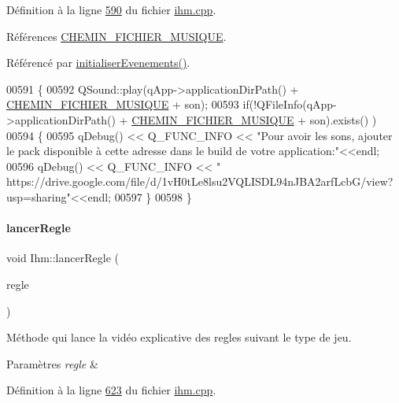 Définition à la ligne \hyperlink{ihm_8cpp_source_l00590}{590} du fichier \hyperlink{ihm_8cpp_source}{ihm.\+cpp}.



Références \hyperlink{ihm_8h_source_l00032}{C\+H\+E\+M\+I\+N\+\_\+\+F\+I\+C\+H\+I\+E\+R\+\_\+\+M\+U\+S\+I\+Q\+UE}.



Référencé par \hyperlink{ihm_8cpp_source_l00075}{initialiser\+Evenements()}.


\begin{DoxyCode}
00591 \{
00592     QSound::play(qApp->applicationDirPath() + \hyperlink{ihm_8h_aaf7f17312e64cf24f4c93fc657e5594f}{CHEMIN\_FICHIER\_MUSIQUE} + son);
00593     \textcolor{keywordflow}{if}(!QFileInfo(qApp->applicationDirPath() + \hyperlink{ihm_8h_aaf7f17312e64cf24f4c93fc657e5594f}{CHEMIN\_FICHIER\_MUSIQUE} + son).exists()
      )
00594     \{
00595         qDebug() << Q\_FUNC\_INFO << \textcolor{stringliteral}{"Pour avoir les sons, ajouter le pack disponible à cette adresse dans le
       build de votre application:"}<<endl;
00596         qDebug() << Q\_FUNC\_INFO << \textcolor{stringliteral}{"
      https://drive.google.com/file/d/1vH0tLe8lsu2VQLISDL94nJBA2arfLcbG/view?usp=sharing"}<<endl;
00597     \}
00598 \}
\end{DoxyCode}
\mbox{\label{class_ihm_a5186bc159a8bf1fa359da4f4ccd78f5a}} 
\paragraph{\texorpdfstring{lancer\+Regle}{lancerRegle}}
{\footnotesize\ttfamily void Ihm\+::lancer\+Regle (\begin{DoxyParamCaption}\item[{Q\+String}]{regle }\end{DoxyParamCaption})\hspace{0.3cm}{\ttfamily [slot]}}



Méthode qui lance la vidéo explicative des regles suivant le type de jeu. 


\begin{DoxyParams}{Paramètres}
{\em regle} & \\
\hline
\end{DoxyParams}


Définition à la ligne \hyperlink{ihm_8cpp_source_l00623}{623} du fichier \hyperlink{ihm_8cpp_source}{ihm.\+cpp}.



